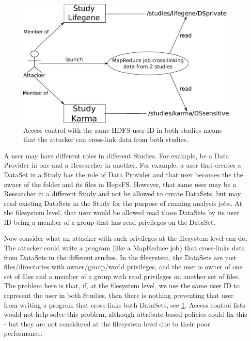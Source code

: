 \begin{figure}[h]
 \centering
 \includegraphics[scale=0.3]{./imgs/studyIsolation.eps}
	\caption{Access control with the same HDFS user ID in both studies means that the attacker can cross-link data from both studies.}
	\label{fig:ac:problem:isolation}
\end{figure}


A user may have different roles in different Studies. For example, be a Data Provider in one and a Researcher in another. For example, a user that creates a DataSet in a Study has the role of Data Provider and that user becomes the the owner of the folder and its files in HopsFS. However, that same user may be a Researcher in a different Study and not be allowed to create DataSets, but may read existing DataSets in the Study for the purpose of running analysis jobs. At the filesystem level, that user would be allowed read those DataSets by its user ID being a member of a group that has read privileges on the DataSet.

Now consider what an attacker with such privileges at the filesystem level can do. The attacker could write a program (like a MapReduce job) that cross-links data from DataSets in the different studies. In the filesystem, the DataSets are just files/directories with owner/group/world privileges, and the user is owner of one set of files and a member of a group with read privileges on another set of files. The problem here is that, if, at the filesystem level, we use the same user ID to represent the user in both Studies, then there is nothing preventing that user from writing a program that cross-links both DataSets, see \ref{fig:ac:problem:isolation}. Access control lists would not help solve this problem, although attribute-based policies could fix this - but they are not considered at the filesystem level due to their poor performance.

